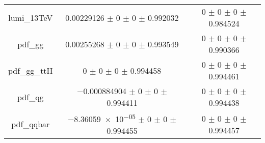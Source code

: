 \begin{table}
\begin{tabular}{ccc}
lumi\_13TeV & \num{0.00229126} $\pm$ \num{0} $\pm$ \num{0} $\pm$ \num{0.992032} & \num{0} $\pm$ \num{0} $\pm$ \num{0} $\pm$ \num{0.984524}\\
pdf\_gg & \num{0.00255268} $\pm$ \num{0} $\pm$ \num{0} $\pm$ \num{0.993549} & \num{0} $\pm$ \num{0} $\pm$ \num{0} $\pm$ \num{0.990366}\\
pdf\_gg\_ttH & \num{0} $\pm$ \num{0} $\pm$ \num{0} $\pm$ \num{0.994458} & \num{0} $\pm$ \num{0} $\pm$ \num{0} $\pm$ \num{0.994461}\\
pdf\_qg & \num{-0.000884904} $\pm$ \num{0} $\pm$ \num{0} $\pm$ \num{0.994411} & \num{0} $\pm$ \num{0} $\pm$ \num{0} $\pm$ \num{0.994438}\\
pdf\_qqbar & \num{-8.36059e-05} $\pm$ \num{0} $\pm$ \num{0} $\pm$ \num{0.994455} & \num{0} $\pm$ \num{0} $\pm$ \num{0} $\pm$ \num{0.994457}\\
\bottomrule
\end{tabular}
\end{table}